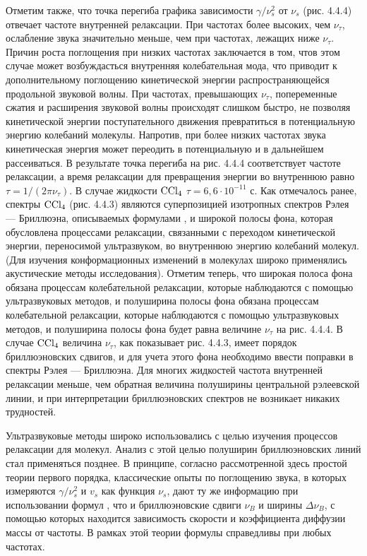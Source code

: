 Отметим также, что точка перегиба графика зависимости
$\gamma/\nu_s^2$ от $\nu_s$ (рис. 4.4.4) отвечает частоте
внутренней релаксации. При частотах более высоких, чем
$\nu_{\tau}$, ослабление звука значительно меньше, чем при
частотах, лежащих ниже $\nu_{\tau}$. Причин роста поглощения при
низких частотах заключается в том, чтов этом случае может
возбуждасться внутренняя колебательная мода, что приводит к
дополнительному поглощению кинетической энергии
распространяющейся продольной звуковой волны. При частотах,
превышающих $\nu_{\tau}$, попеременные сжатия и расширения
звуковой волны происходят слишком быстро, не позволяя
кинетической энергии поступательного движения превратиться в
потенциальную энергию колебаний молекулы. Напротив, при более
низких частотах звука кинетическая энергия может переодить в
потенциальную и в дальнейшем рассеиваться. В результате точка
перегиба на рис. 4.4.4 соответствует частоте релаксации, а время
релаксации для превращения энергии во внутреннюю равно
$\tau=1/(2\pi\nu_{\tau})$. В случае жидкости $\rm CCl_4$
$\tau=6,6\cdot10^{-11}$ с. Как отмечалось ранее, спектры $\rm
CCl_4$ (рис. 4.4.3) являются суперпозицией изотропных спектров
Рэлея --- Бриллюэна, описываемых формулами , и широкой
полосы фона, которая обусловлена процессами релаксации,
связанными с переходом кинетической энергии, переносимой
ультразвуком, во внутреннюю энергию колебаний молекул. (Для
изучения конформационных изменений в молекулах широко применялись
акустические методы исследования). Отметим теперь, что
широкая полоса фона обязана процессам колебательной релаксации,
которые наблюдаются с помощью ультразвуковых методов, и
полуширина полосы фона обязана процессам колебательной
релаксации, которые наблюдаются с помощью ультразвуковых методов,
и полуширина полосы фона будет равна величине $\nu_{\tau}$ на
рис. 4.4.4. В случае $\rm CCl_4$ величина $\nu_{\tau}$, как
показывает рис. 4.4.3, имеет порядок бриллюэновских сдвигов, и
для учета этого фона необходимо ввести поправки в спектры Рэлея
--- Бриллюэна. Для многих жидкостей частота внутренней релаксации
меньше, чем обратная величина полуширины центральной рэлеевской
линии, и при интерпретации бриллюэновских спектров не возникает
никаких трудностей.

Ультразвуковые методы широко использовались с целью изучения
процессов релаксации для молекул. Анализ с этой целью
полуширин бриллюэновских линий стал применяться позднее. В
принципе, согласно рассмотренной здесь простой теории первого
порядка, классические опыты по поглощению звука, в которых
измеряются $\gamma/\nu_s^2$ и $v_s$ как функция $\nu_s$, дают ту
же информацию при использовании формул , что и
бриллюэновские сдвиги $\nu_B$ и ширины $\Delta\nu_B$,  с помощью
которых находится зависимость скорости и коэффициента диффузии
массы от частоты. В рамках этой теории формулы 
справедливы при любых частотах.

